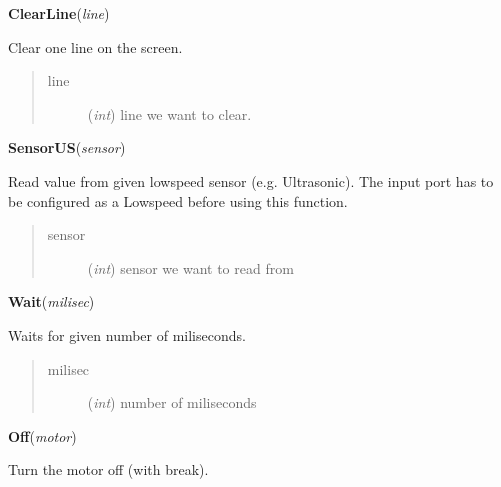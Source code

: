 \documentclass[10pt,a4paper]{article}
\begin{document}
 

\vspace{6pt}
{\bf ClearLine}({\it line}) 
    
    Clear one line on the screen.
    

    

\begin{quote}
    \begin{description}
        
\item[line] ({\emph{int}}) line we want to clear.

    \end{description}
\end{quote}

 

\vspace{6pt}
{\bf SensorUS}({\it sensor}) 

    Read value from given lowspeed sensor (e.g. Ultrasonic). The input port 
    has to be configured as a Lowspeed before using this function.
    

    

\begin{quote}
    \begin{description}
        
\item[sensor] ({\emph{int}}) sensor we want to read from

    \end{description}
\end{quote}

 

\vspace{6pt}
{\bf Wait}({\it milisec}) 
    
    Waits for given number of miliseconds.


    

\begin{quote}
    \begin{description}
        
\item[milisec] ({\emph{int}}) number of miliseconds

    \end{description}
\end{quote}

 

\vspace{6pt}
{\bf Off}({\it motor}) 
    
    Turn the motor off (with break).
    
\end{document}
